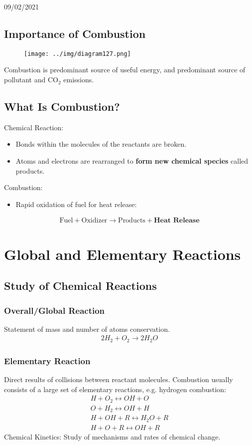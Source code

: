 \documentclass[class=report, crop=false, 12pt,a4paper]{standalone}
\numberwithin{equation}{section}
\begin{document}
\begin{center}
  09/02/2021
\end{center}
\subsection*{Importance of Combustion}
\begin{figure}[H]
  \centering
  \texttt{[image: ../img/diagram127.png]}
  \caption{}
\end{figure}
Combustion is predominant source of useful energy, and predominant source of pollutant and CO$_2$ emissions.
\subsection*{What Is Combustion?}
Chemical Reaction:
\begin{itemize}[noitemsep]
  \item Bonds within the molecules of the reactants are broken.
  \item Atoms and electrons are rearranged to \textbf{form new chemical species} called products.
\end{itemize}
Combustion:
\begin{itemize}[noitemsep]
  \item Rapid oxidation of fuel for heat release:
\end{itemize}
\begin{gather}
  \text{Fuel} + \text{Oxidizer} \longrightarrow \text{Products} + \textbf{Heat Release}
\end{gather}
\section{Global and Elementary Reactions}
\subsection{Study of Chemical Reactions}
\subsubsection{Overall/Global Reaction}
Statement of mass and number of atoms conservation.
\begin{gather}
  2H_2 + O_2 \longrightarrow 2H_2O
\end{gather}
\subsubsection{Elementary Reaction}
Direct results of collisions between reactant molecules. Combustion usually consists of a large set of elementary reactions, e.g. hydrogen combustion:
\begin{gather}
  H + O_2 \longleftrightarrow OH + O \\[5pt]
  O + H_2 \longleftrightarrow OH + H \\[5pt]
  H + OH + R \longleftrightarrow H_2O + R \\[5pt]
  H + O + R \longleftrightarrow OH + R
\end{gather}
Chemical Kinetics: Study of mechanisms and rates of chemical change.
\end{document}
